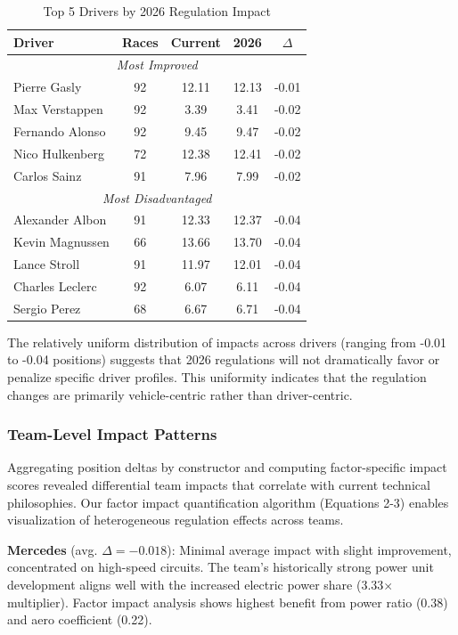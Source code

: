\documentclass[conference]{IEEEtran}
\begin{document}
\begin{table}[h]
\centering
\caption{Top 5 Drivers by 2026 Regulation Impact}
\begin{tabular}{lcccc}
\toprule
\textbf{Driver} & \textbf{Races} & \textbf{Current} & \textbf{2026} & \textbf{$\Delta$} \\
\midrule
\multicolumn{5}{c}{\textit{Most Improved}} \\
\midrule
Pierre Gasly & 92 & 12.11 & 12.13 & -0.01 \\
Max Verstappen & 92 & 3.39 & 3.41 & -0.02 \\
Fernando Alonso & 92 & 9.45 & 9.47 & -0.02 \\
Nico Hulkenberg & 72 & 12.38 & 12.41 & -0.02 \\
Carlos Sainz & 91 & 7.96 & 7.99 & -0.02 \\
\midrule
\multicolumn{5}{c}{\textit{Most Disadvantaged}} \\
\midrule
Alexander Albon & 91 & 12.33 & 12.37 & -0.04 \\
Kevin Magnussen & 66 & 13.66 & 13.70 & -0.04 \\
Lance Stroll & 91 & 11.97 & 12.01 & -0.04 \\
Charles Leclerc & 92 & 6.07 & 6.11 & -0.04 \\
Sergio Perez & 68 & 6.67 & 6.71 & -0.04 \\
\bottomrule
\end{tabular}
\label{tab:driver_impacts}
\end{table}

The relatively uniform distribution of impacts across drivers (ranging from -0.01 to -0.04 positions) suggests that 2026 regulations will not dramatically favor or penalize specific driver profiles. This uniformity indicates that the regulation changes are primarily vehicle-centric rather than driver-centric.

\subsubsection{Team-Level Impact Patterns}

Aggregating position deltas by constructor and computing factor-specific impact scores revealed differential team impacts that correlate with current technical philosophies. Our factor impact quantification algorithm (Equations 2-3) enables visualization of heterogeneous regulation effects across teams.

\textbf{Mercedes} (avg. $\Delta = -0.018$): Minimal average impact with slight improvement, concentrated on high-speed circuits. The team's historically strong power unit development aligns well with the increased electric power share (3.33$\times$ multiplier). Factor impact analysis shows highest benefit from power ratio (0.38) and aero coefficient (0.22).
\end{document}
